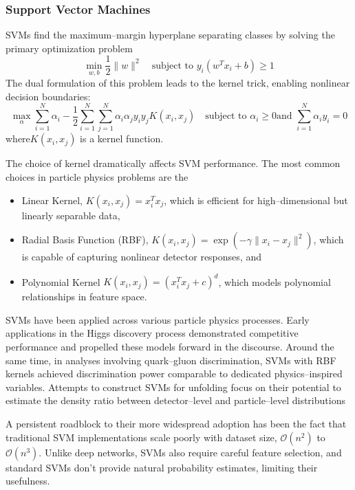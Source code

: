     \subsubsection{Support Vector Machines}
        SVMs find the maximum--margin hyperplane separating classes by solving the primary optimization problem
        \begin{equation}
            \min_{w,b} \frac{1}{2}\|w\|^2 \quad \text{subject to } y_i(w^T x_i + b) \geq 1
        \end{equation}
        The dual formulation of this problem leads to the kernel trick, enabling nonlinear decision boundaries:
        \begin{equation}
            \max_{\alpha} \sum_{i=1}^N \alpha_i - \frac{1}{2}\sum_{i=1}^N\sum_{j=1}^N \alpha_i\alpha_j y_i y_j K(x_i,x_j)\quad\text{subject to }\alpha_i\ge0 \text{and } \sum_{i=1}^N \alpha_i y_i = 0
        \end{equation}
        where\(K(x_i,x_j)\) is a kernel function.
    
        The choice of kernel dramatically affects SVM performance. The most common choices in particle physics problems are the
        \begin{itemize}
            \item Linear Kernel, \(K(x_i,x_j) = x_i^T x_j\), which is efficient for high--dimensional but linearly separable data,
            \item Radial Basis Function (RBF), \(K(x_i,x_j) = \exp(-\gamma\|x_i-x_j\|^2)\), which is capable of capturing nonlinear detector responses, and
            \item Polynomial Kernel \(K(x_i,x_j) = (x_i^T x_j + c)^d\), which models polynomial relationships in feature space.
        \end{itemize}
        SVMs have been applied across various particle physics processes.
        Early applications in the Higgs discovery process demonstrated competitive performance and propelled these models forward in the discourse.
        Around the same time, in analyses involving quark--gluon discrimination, SVMs with RBF kernels achieved discrimination power comparable to dedicated physics--inspired variables.
        Attempts to construct SVMs for unfolding focus on their potential to estimate the density ratio between detector--level and particle--level distributions
        
        A persistent roadblock to their more widespread adoption has been the fact that traditional SVM implementations scale poorly with dataset size, \(\mathcal O(n^2)\) to \(\mathcal O(n^3)\).
        Unlike deep networks, SVMs also require careful feature selection, and standard SVMs don't provide natural probability estimates, limiting their usefulness.

